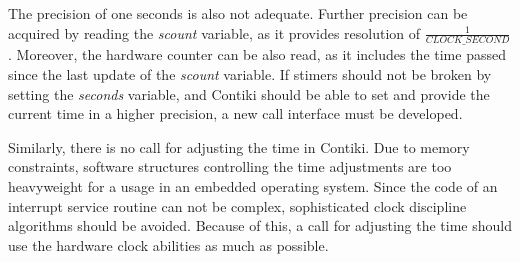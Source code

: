 The precision of one seconds is also not adequate.
Further precision can be acquired by reading the {\it{scount}} variable,
as it provides resolution of $\frac{1}{CLOCK\_SECOND}$.
Moreover, the hardware counter can be also read, as it includes the time passed since
the last update of the {\it{scount}} variable.
If stimers should not be broken by setting the {\it{seconds}} variable,
and Contiki should be able to set and provide the current time in a higher precision,
a new call interface must be developed.

Similarly, there is no call for adjusting the time in Contiki.
Due to memory constraints, software structures controlling the time adjustments are too heavyweight
for a usage in an embedded operating system.
Since the code of an interrupt service routine can not be complex,
sophisticated clock discipline algorithms should be avoided.
Because of this, a call for adjusting the time should use the hardware clock abilities as much as possible.
